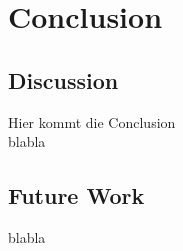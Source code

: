 \chapter{Conclusion}
\label{sec:conclusion}
\section{Discussion}
Hier kommt die Conclusion\\
blabla
\section{Future Work}
blabla